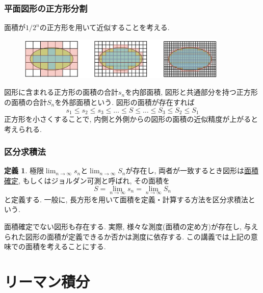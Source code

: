 \documentclass[dvipdfmx,cjk,10.2pt]{beamer}
\theoremstyle{definition}
\newtheorem{Def}[Thm]{定義}
\begin{document}
\begin{frame}
\frametitle{平面図形の正方形分割}
面積が$1/2^n$の正方形を用いて近似することを考える. 

\begin{figure}[htbp]
 \begin{center} 
  \includegraphics[width=100mm]{cover4.png}
 \end{center}
\end{figure}

図形に含まれる正方形の面積の合計$s_n$を内部面積, 図形と共通部分を持つ正方形の面積の合計$S_n$を外部面積という.  
図形の面積が存在すれば
$$
s_1 \le s_2 \le s_3 \le \dots \le S \le \dots \le S_3 \le S_2 \le S_1
$$
正方形を小さくすることで, 内側と外側からの図形の面積の近似精度が上がると考えられる. 


\end{frame}




\begin{frame}
\frametitle{区分求積法}

\begin{Def}
極限$\displaystyle \lim_{n\to \infty}s_n$と$\displaystyle \lim_{n\to \infty}S_n$が存在し, 
両者が一致するとき図形は\underline{面積確定}, もしくはジョルダン可測と呼ばれ,  
その面積を
$$
S= \lim_{n\to \infty}s_n=\lim_{n\to \infty}S_n
$$
と定義する. 
一般に, 長方形を用いて面積を定義・計算する方法を区分求積法という. 
\end{Def}

面積確定でない図形も存在する. 
実際, 様々な測度(面積の定め方)が存在し, 与えられた図形の面積が定義できるか否かは測度に依存する. 
この講義では上記の意味での面積を考えることにする. 


\end{frame}



\section{リーマン積分}
\end{document}
